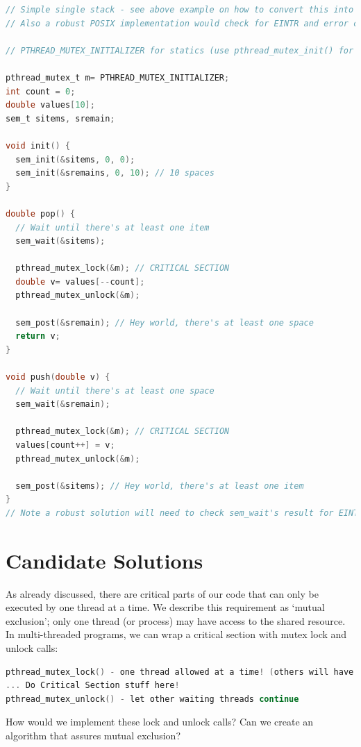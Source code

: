\begin{lstlisting}[language=C]
// Simple single stack - see above example on how to convert this into a multiple stacks.
// Also a robust POSIX implementation would check for EINTR and error codes of sem_wait.

// PTHREAD_MUTEX_INITIALIZER for statics (use pthread_mutex_init() for stack/heap memory)

pthread_mutex_t m= PTHREAD_MUTEX_INITIALIZER; 
int count = 0;
double values[10];
sem_t sitems, sremain;

void init() {
  sem_init(&sitems, 0, 0);
  sem_init(&sremains, 0, 10); // 10 spaces
}

double pop() {
  // Wait until there's at least one item
  sem_wait(&sitems);

  pthread_mutex_lock(&m); // CRITICAL SECTION
  double v= values[--count];
  pthread_mutex_unlock(&m);

  sem_post(&sremain); // Hey world, there's at least one space
  return v;
}

void push(double v) {
  // Wait until there's at least one space
  sem_wait(&sremain);

  pthread_mutex_lock(&m); // CRITICAL SECTION
  values[count++] = v;
  pthread_mutex_unlock(&m);

  sem_post(&sitems); // Hey world, there's at least one item
}
// Note a robust solution will need to check sem_wait's result for EINTR (more about this later)
\end{lstlisting}

\section{Candidate Solutions}\label{candidate-solutions}

As already discussed, there are critical parts of our code that can only be executed by one thread at a time. We describe this requirement as `mutual exclusion'; only one thread (or process) may have access to the shared resource. In multi-threaded programs, we can wrap a critical section with mutex lock and unlock calls:

\begin{lstlisting}[language=C]
pthread_mutex_lock() - one thread allowed at a time! (others will have to wait here)
... Do Critical Section stuff here!
pthread_mutex_unlock() - let other waiting threads continue
\end{lstlisting}

How would we implement these lock and unlock calls? Can we create an algorithm that assures mutual exclusion?

